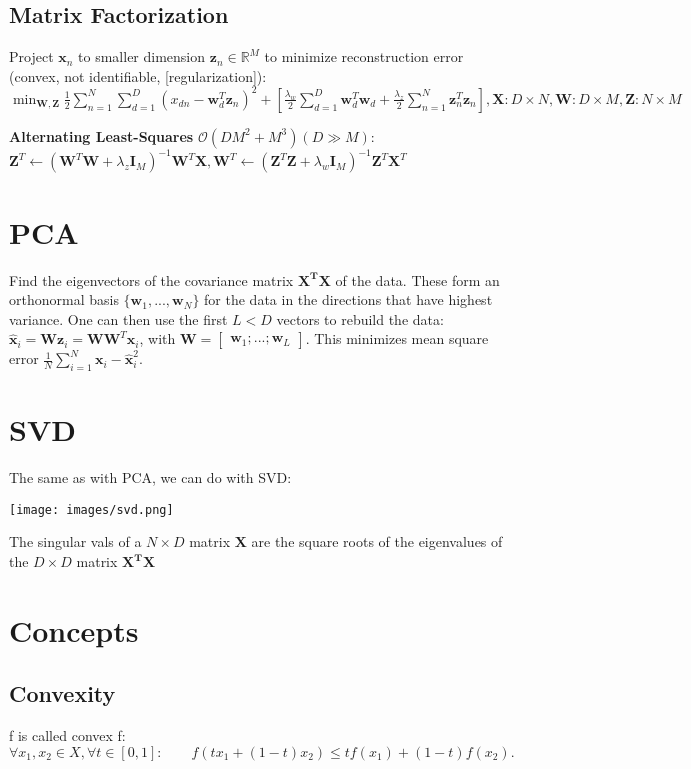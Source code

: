 \documentclass[10pt,a4paper,landscape]{article}
\renewcommand{\bf}[1]{\ensuremath{\mathbf{#1}}}
\begin{document}
\begin{multicols*}{4}
\subsection{Matrix Factorization}

Project $\bf{x}_n$ to smaller dimension $\bf{z}_n \in \mathbb{R}^M$ to minimize reconstruction error (convex, not identifiable, [regularization]): $\min_{\bf{W, Z}} \frac{1}{2} \sum_{n=1}^N \sum_{d=1}^D (x_{dn} - \bf{w}_d^T \bf{z}_n )^2 
+ [\frac{\lambda_w}{2} \sum_{d=1}^D \bf{w}_d^T \bf{w}_d + \frac{\lambda_z}{2} \sum_{n=1}^N \bf{z}_n^T \bf{z}_n], 
\bf{X}: D \times N, \bf{W}: D \times M, \bf{Z}: N \times M$

\textbf{Alternating Least-Squares} $\mathcal{O}(DM^2 + M^3) (D \gg M)$: $\bf{Z}^T \leftarrow (\bf{W}^T \bf{W} + \lambda_z \bf{I}_M )^{-1} \bf{W}^T \bf{X},
\bf{W}^T \leftarrow (\bf{Z}^T \bf{Z} + \lambda_w \bf{I}_M )^{-1} \bf{Z}^T \bf{X}^T$

\section{PCA}
Find the eigenvectors of the covariance matrix $\bf{X^T X}$ of the data. These form an orthonormal basis $\{ \bf{w}_1, ..., \bf{w}_N\}$ for the data in the directions that have highest variance.
One can then use the first $L < D$ vectors to rebuild the data: $\bf{\hat{x}}_i = \bf{W} \bf{z}_i = \bf{W} \bf{W}^T \bf{x}_i$, with $\bf{W} = \begin{bmatrix} \bf{w}_1 ; ... ; \bf{w}_L \end{bmatrix}$.
This minimizes mean square error $\frac{1}{N} \sum_{i=1}^N \bf{x}_i - \bf{\hat{x}}_i^2$.

\section{SVD}
The same as with PCA, we can do with SVD:
\begin{colfig}
  \centering
  \texttt{[image: images/svd.png]}
\end{colfig}

The singular vals of a $N \times D$ matrix $\bf{X}$ are the square roots of the eigenvalues of the $D \times D$ matrix $\bf{X^T X}$
\section{Concepts}

\subsection{Convexity}
f is called convex f: $\forall x_1, x_2 \in X, \forall t \in [0, 1]: \qquad f(tx_1+(1-t)x_2)\leq t f(x_1)+(1-t)f(x_2).$


\end{multicols*}
\end{document}
